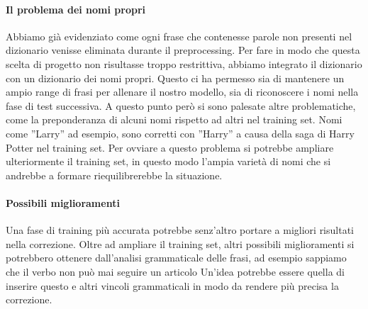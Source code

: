 \paragraph*{Il problema dei nomi propri} 
Abbiamo già evidenziato come ogni frase che contenesse parole non presenti nel dizionario venisse eliminata durante il preprocessing. Per fare in modo che questa scelta di progetto non risultasse troppo restrittiva, abbiamo integrato il dizionario con un dizionario dei nomi propri. 
Questo ci ha permesso sia di mantenere un ampio range di frasi per allenare il nostro modello, sia di riconoscere i nomi nella fase di test successiva. A questo punto però si sono palesate altre problematiche, come la preponderanza di alcuni nomi rispetto ad altri nel training set. Nomi come ''Larry'' ad esempio, sono corretti con ''Harry'' a causa della saga di Harry Potter nel training set. Per ovviare a questo problema si potrebbe ampliare ulteriormente il training set, in questo modo l'ampia varietà di nomi che si andrebbe a formare riequilibrerebbe la situazione.

\paragraph*{Possibili miglioramenti}
Una fase di training più accurata potrebbe senz'altro portare a migliori risultati nella correzione. Oltre ad ampliare il training set, altri possibili miglioramenti si potrebbero ottenere dall'analisi grammaticale delle frasi, ad esempio sappiamo che il verbo non può mai seguire un articolo Un'idea potrebbe essere quella di inserire questo e altri vincoli grammaticali in modo da rendere più precisa la correzione.